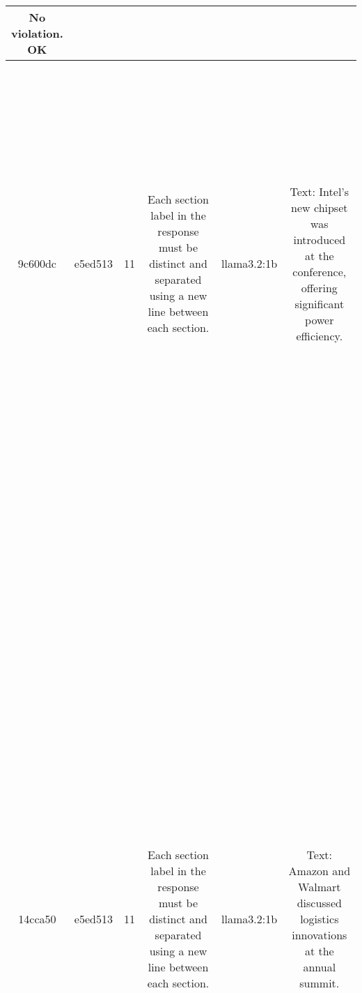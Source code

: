 \begin{table}[h!]
\begin{tabular}{|c|c|c|c|c|c|c|c|c|c|}
No violation.
OK & \\
\hline
9c600dc & e5ed513 & 11 & Each section label in the response must be distinct and separated using a new line between each section. & llama3.2:1b & Text: Intel's new chipset was introduced at the conference, offering significant power efficiency. & Company names: Intels
People names: None mentioned
Specific topics: Power efficiency in computer chips
General themes: Innovation (specifically the introduction of a new chipset) & ok & The chatbot output follows the format described. It lists "Company names," "People names," "Specific topics," and "General themes," each followed by a corresponding list. There is no violation here as the format is adhered to. 

No violation.
OK & \\
\hline
14cca50 & e5ed513 & 11 & Each section label in the response must be distinct and separated using a new line between each section. & llama3.2:1b & Text: Amazon and Walmart discussed logistics innovations at the annual summit. & Here are the extracted entities:

**Company Names:** Amazon, Walmart
**People Names:** None mentioned in the passage
**Specific Topics:**
- Logistics innovations
- Annual summit (presumably a industry or business event)

**General Themes:**
- Collaboration and partnership in business (Amazon and Walmart discussing logistics together)
- Innovation and advancement in industry-specific events (annual summit) & ok & The chatbot output complies with the required format and structure as described. It has extracted company names, people names, specific topics, and general themes in the order specified. The company names listed are Amazon and Walmart, which are succinctly provided as a comma-separated list. The people names section appropriately states "None mentioned in the passage," which adheres to the rule when no people names are extracted. Specific topics and general themes are provided in bullet-point form, clearly categorizing them as requested by the description.

No violation.
OK & \\
\hline
a632efd & e5ed513 & 12 & The response must not include any introductory text, explanations, or extraneous information not specified in the desired format. & llama3.2:1b & Text: The collaborative work between IBM and academia on AI ethics was highlighted by John Doe. & Company names: <none>
People names:
- John Doe
Specific topics: -||-
General themes: Collaboration, Artificial Intelligence (AI), Ethics & err & There are a few points of non-compliance in this output:


\end{tabular}
\end{table}
